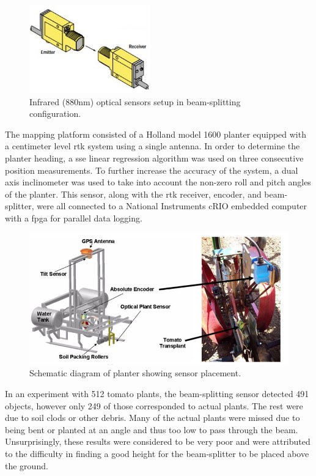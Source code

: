 \begin{figure}
	\centering
    \includegraphics[height=1.5in]{figures/tomator_optical_sensor.jpg}
    \caption[Infrared beam-splitter]{Infrared (880nm) optical sensors setup in beam-splitting configuration.}
    \label{figure:optical_sensor}
\end{figure}

The mapping platform consisted of a Holland model 1600 planter equipped with a centimeter level \ac{rtk} system using a single antenna.  In order to determine the planter heading, a \ac{sse} linear regression algorithm was used on three consecutive position measurements. To further increase the accuracy of the system, a dual axis inclinometer was used to take into account the non-zero roll and pitch angles of the planter.  This sensor, along with the \ac{rtk} receiver, encoder, and beam-splitter, were all connected to a National Instruments cRIO embedded computer with a \ac{fpga} for parallel data logging.    

\begin{figure}
	\centering
    \includegraphics[width=6in]{figures/tomator_planter.jpg}
    \caption[Tomato mapping platform]{Schematic diagram of planter showing sensor placement.}
    \label{figure:tomato_planter}
\end{figure}

In an experiment with 512 tomato plants, the beam-splitting sensor detected 491 objects, however only 249 of those corresponded to actual plants.  The rest were due to soil clods or other debris.  Many of the actual plants were missed due to being bent or planted at an angle and thus too low to pass through the beam.  Unsurprisingly, these results were considered to be very poor and were attributed to the difficulty in finding a good height for the beam-splitter to be placed above the ground.

